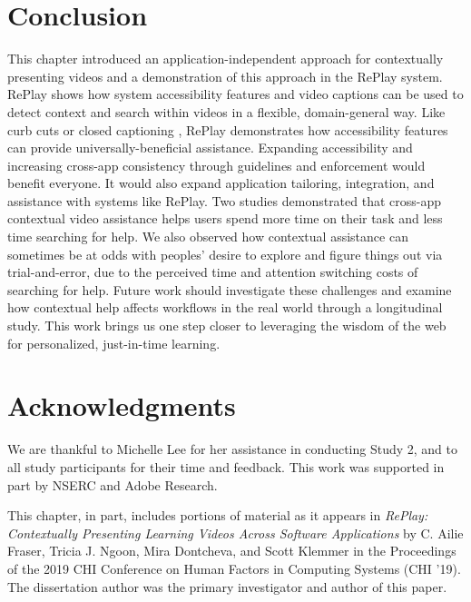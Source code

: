 \section{Conclusion}
This chapter introduced an application-independent approach for contextually presenting videos and a demonstration of this approach in the RePlay system. RePlay shows how system accessibility features and video captions can be used to detect context and search within videos in a flexible, domain-general way. Like curb cuts or closed captioning \cite{Rose2002}, RePlay demonstrates how accessibility features can provide universally-beneficial assistance. 
Expanding accessibility and increasing cross-app consistency through guidelines and enforcement would benefit everyone. It would also expand application tailoring, integration, and assistance with systems like RePlay. Two studies demonstrated that cross-app contextual video assistance helps users spend more time on their task and less time searching for help. We also observed how contextual assistance can sometimes be at odds with peoples' desire to explore and figure things out via trial-and-error, due to the perceived time and attention switching costs of searching for help.
Future work should investigate these challenges and examine how contextual help affects workflows in the real world through a longitudinal study. This work brings us one step closer to leveraging the wisdom of the web for personalized, just-in-time learning.

\section{Acknowledgments}
We are thankful to Michelle Lee for her assistance in conducting Study 2, and to all study participants for their time and feedback. This work was supported in part by NSERC and Adobe Research.

This chapter, in part, includes portions of material as it appears in \textit{RePlay: Contextually Presenting Learning Videos Across Software Applications} by C. Ailie Fraser, Tricia J. Ngoon, Mira Dontcheva, and Scott Klemmer in the Proceedings of the 2019 CHI Conference on Human Factors in Computing Systems (CHI '19). The dissertation author was the primary investigator and author of this paper.
